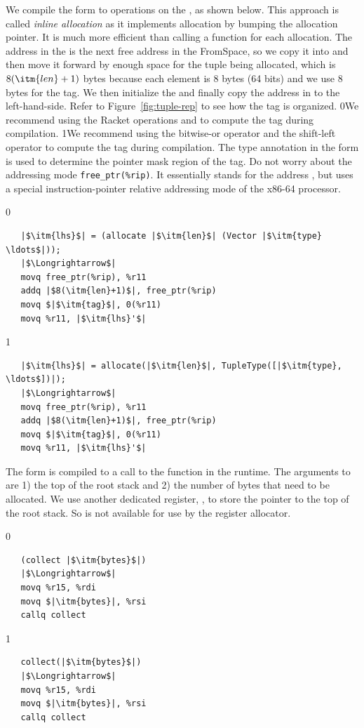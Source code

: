 \documentclass[7x10,nocrop]{TimesAPriori_MIT}%
\def\racketEd{0}
\def\pythonEd{1}
\def\edition{1}
\newcommand{\racket}[1]{{\if\edition\racketEd{#1}\fi}}
\newcommand{\python}[1]{{\if\edition\pythonEd #1\fi}}
\begin{document}
We compile the  form to operations on the
, as shown below. This approach is called \emph{inline
allocation} as it implements allocation by bumping the allocation
pointer. It is much more efficient than calling a function for each
allocation. The address in the 
is the next free address in the FromSpace, so we copy it into
 and then move it forward by enough space for the tuple
being allocated, which is $8(\itm{len}+1)$ bytes because each element
is 8 bytes (64 bits) and we use 8 bytes for the tag.  We then
initialize the  and finally copy the address in  to
the left-hand-side. Refer to Figure~\ref{fig:tuple-rep} to see how the
tag is organized.
%
\racket{We recommend using the Racket operations
\code{bitwise-ior} and \code{arithmetic-shift} to compute the tag
during compilation.}
%
\python{We recommend using the bitwise-or operator \code{|} and the
  shift-left operator \code{<<} to compute the tag during
  compilation.}
%
The type annotation in the  form is used to determine
the pointer mask region of the tag.
%
Do not worry about the addressing mode \verb!free_ptr(%rip)!. It
essentially stands for the address , but uses a
special instruction-pointer relative addressing mode of the x86-64
processor. 
%
{\if\edition\racketEd
\begin{lstlisting}
   |$\itm{lhs}$| = (allocate |$\itm{len}$| (Vector |$\itm{type} \ldots$|));
   |$\Longrightarrow$|
   movq free_ptr(%rip), %r11
   addq |$8(\itm{len}+1)$|, free_ptr(%rip)
   movq $|$\itm{tag}$|, 0(%r11)
   movq %r11, |$\itm{lhs}'$|
\end{lstlisting}
\fi}
{\if\edition\pythonEd    
\begin{lstlisting}
   |$\itm{lhs}$| = allocate(|$\itm{len}$|, TupleType([|$\itm{type}, \ldots$])|);
   |$\Longrightarrow$|
   movq free_ptr(%rip), %r11
   addq |$8(\itm{len}+1)$|, free_ptr(%rip)
   movq $|$\itm{tag}$|, 0(%r11)
   movq %r11, |$\itm{lhs}'$|
\end{lstlisting}
\fi}
The  form is compiled to a call to the 
function in the runtime. The arguments to  are 1) the
top of the root stack and 2) the number of bytes that need to be
allocated.  We use another dedicated register, , to
store the pointer to the top of the root stack. So  is not
available for use by the register allocator.
{\if\edition\racketEd
\begin{lstlisting}
   (collect |$\itm{bytes}$|)
   |$\Longrightarrow$|
   movq %r15, %rdi
   movq $|\itm{bytes}|, %rsi
   callq collect
\end{lstlisting}
\fi}
{\if\edition\pythonEd    
\begin{lstlisting}
   collect(|$\itm{bytes}$|)
   |$\Longrightarrow$|
   movq %r15, %rdi
   movq $|\itm{bytes}|, %rsi
   callq collect
\end{lstlisting}
\fi}
\end{document}
